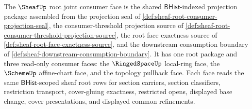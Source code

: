 \begin{definition}
\label{def:sheaf-root-joint-consumer-face}
The $\SheafUp$ root joint consumer face is the shared $\mathsf{BHist}$-indexed projection package assembled from the projection seal of \autoref{def:sheaf-root-consumer-projection-seal}, the consumer-threshold projection source of \autoref{def:sheaf-root-consumer-threshold-projection-source}, the root face exactness source of \autoref{def:sheaf-root-face-exactness-source}, and the downstream consumption boundary of \autoref{def:sheaf-downstream-consumption-boundary}. It has one root package and three read-only consumer faces: the $\RingedSpaceUp$ local-ring face, the $\SchemeUp$ affine-chart face, and the topology pullback face. Each face reads the same $\mathsf{BHist}$-scoped sheaf root rows for section carriers, section classifiers, restriction transport, cover-gluing exactness, restricted opens, displayed base change, cover presentations, and displayed common refinements.
\end{definition}

